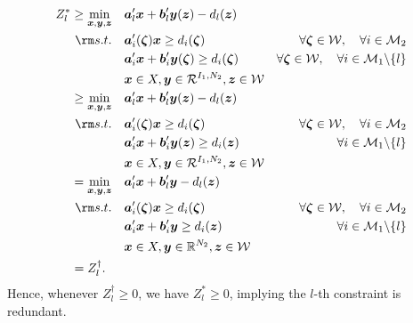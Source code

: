 \documentclass[fleqn,isre,blindrev]{informs4}
\newcommand{\mb}[1]{\mbox{\boldmath \ensuremath{#1}}}
\begin{document}
\begin{equation*}
			\begin{aligned} 
				Z^*_l \geq	\min_{ \boldsymbol{x} , \boldsymbol{y}, \boldsymbol{z}} \quad & \mb{a}'_l\mb{x}+\mb{b}'_l \mb{y}(\mb{z}) - d_l(\mb{z})  \\
				{\rm s.t.}  \quad &  \mb{a}'_i(\mb{\zeta})\mb{x} \geq d_i(\mb{\zeta}) &  \forall  \mb{\zeta} \in  \mathcal{W}, \quad \forall i  \in \mathcal{M}_2 \\
				\quad & \mb{a}'_i\mb{x}+ \mb{b}'_i \mb{y}(\mb{\zeta}) \geq d_i(\mb{\zeta})  &  \forall  \mb{\zeta} \in  \mathcal{W},  \quad \forall i  \in \mathcal{M}_1 \backslash \{l\} \\
				\quad &\mb{x} \in X, \mb{y} \in \mathcal{R}^{I_1,N_2},  \mb{z} \in \mathcal{W}\\
				\geq \min_{ \boldsymbol{x} , \boldsymbol{y}, \boldsymbol{z}} \quad & \mb{a}'_l\mb{x}+\mb{b}'_l \mb{y}(\mb{z}) - d_l(\mb{z})  \\
				{\rm s.t.}  \quad &  \mb{a}'_i(\mb{\zeta})\mb{x} \geq d_i(\mb{\zeta}) &  \forall  \mb{\zeta} \in  \mathcal{W}, \quad \forall i  \in \mathcal{M}_2   \\
				\quad & \mb{a}'_i\mb{x}+ \mb{b}'_i \mb{y}(\mb{z}) \geq d_i(\mb{z})  &  \forall i  \in \mathcal{M}_1 \backslash \{l\} \\
				\quad &\mb{x} \in X, \mb{y} \in \mathcal{R}^{I_1,N_2},  \mb{z} \in \mathcal{W} \\
				= \min_{ \boldsymbol{x} , \boldsymbol{y}, \boldsymbol{z}} \quad & \mb{a}'_l\mb{x}+\mb{b}'_l \mb{y} - d_l(\mb{z})  \\
				{\rm s.t.}  \quad &  \mb{a}'_i(\mb{\zeta})\mb{x} \geq d_i(\mb{\zeta}) &  \forall  \mb{\zeta} \in  \mathcal{W}, \quad \forall i  \in \mathcal{M}_2\\
				\quad & \mb{a}'_i\mb{x}+ \mb{b}'_i \mb{y} \geq d_i(\mb{z})  &  \forall i  \in \mathcal{M}_1 \backslash \{l\} \\
				\quad & \mb{x} \in X, \mb{y} \in \mathbb{R}^{N_2},  \mb{z} \in \mathcal{W} \\
				= Z^\dag_l. \enskip \quad
			\end{aligned} 
\end{equation*}
		Hence, whenever $Z^\dag_l \geq 0$, we have $Z^*_l \geq 0$, implying the $l$-th constraint is redundant.  \hfill \Halmos \\
		
\end{document}
